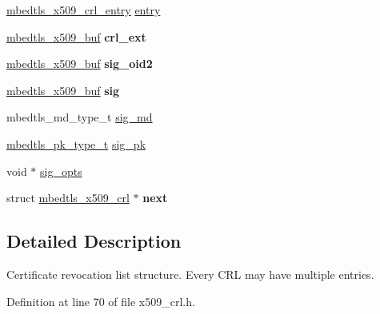 \begin{DoxyCompactItemize}
\item 
\hyperlink{structmbedtls__x509__crl__entry}{mbedtls\-\_\-x509\-\_\-crl\-\_\-entry} \hyperlink{structmbedtls__x509__crl_a880036b1b4a2b449542f8f1fa389694f}{entry}
\item 
\hypertarget{structmbedtls__x509__crl_a6bed76483128f2128c0b92cba28ac118}{\hyperlink{group__x509__module_ga4d02c9e8e4e2934555e0d132cd2976dc}{mbedtls\-\_\-x509\-\_\-buf} {\bfseries crl\-\_\-ext}}\label{structmbedtls__x509__crl_a6bed76483128f2128c0b92cba28ac118}

\item 
\hypertarget{structmbedtls__x509__crl_ac2c9b5655e5dfaabd3d285e8e0b4b34b}{\hyperlink{group__x509__module_ga4d02c9e8e4e2934555e0d132cd2976dc}{mbedtls\-\_\-x509\-\_\-buf} {\bfseries sig\-\_\-oid2}}\label{structmbedtls__x509__crl_ac2c9b5655e5dfaabd3d285e8e0b4b34b}

\item 
\hypertarget{structmbedtls__x509__crl_a91614cb3497ac7220394c04014cf0f2d}{\hyperlink{group__x509__module_ga4d02c9e8e4e2934555e0d132cd2976dc}{mbedtls\-\_\-x509\-\_\-buf} {\bfseries sig}}\label{structmbedtls__x509__crl_a91614cb3497ac7220394c04014cf0f2d}

\item 
mbedtls\-\_\-md\-\_\-type\-\_\-t \hyperlink{structmbedtls__x509__crl_a85c03124f3b4a2afe8b5c47fab13a8a9}{sig\-\_\-md}
\item 
\hyperlink{pk_8h_a3fe41eff5605ae727eb9d28dad297020}{mbedtls\-\_\-pk\-\_\-type\-\_\-t} \hyperlink{structmbedtls__x509__crl_a8c94375266c53f6e73d0134dc978151a}{sig\-\_\-pk}
\item 
void $\ast$ \hyperlink{structmbedtls__x509__crl_ad59e3744b290f19d6400678d364aef77}{sig\-\_\-opts}
\item 
\hypertarget{structmbedtls__x509__crl_a6dbfb57fe2c749c3bff9f7f45aacec05}{struct \hyperlink{structmbedtls__x509__crl}{mbedtls\-\_\-x509\-\_\-crl} $\ast$ {\bfseries next}}\label{structmbedtls__x509__crl_a6dbfb57fe2c749c3bff9f7f45aacec05}

\end{DoxyCompactItemize}


\subsection{Detailed Description}
Certificate revocation list structure. Every C\-R\-L may have multiple entries. 

Definition at line 70 of file x509\-\_\-crl.\-h.



